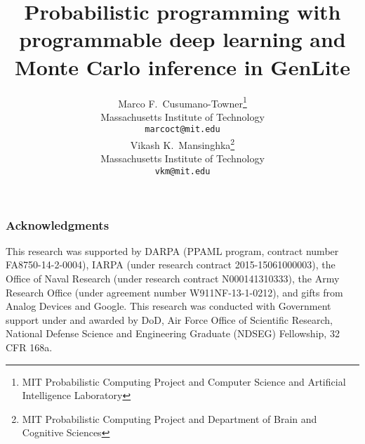 \documentclass{article}
\title{Probabilistic programming with programmable deep learning and Monte Carlo inference in GenLite}
\author{
  Marco F.~Cusumano-Towner\thanks{MIT Probabilistic Computing Project and Computer Science and Artificial Intelligence Laboratory}\\
  Massachusetts Institute of Technology\\
  \texttt{marcoct@mit.edu} \\
  \And
  Vikash K.~Mansinghka\thanks{MIT Probabilistic Computing Project and Department of Brain and Cognitive Sciences}\\
  Massachusetts Institute of Technology\\
  \texttt{vkm@mit.edu}
}
\begin{document}
\maketitle










\subsubsection*{Acknowledgments}
This research was supported by DARPA (PPAML program, contract number FA8750-14-2-0004), IARPA (under research contract 2015-15061000003), the Office of Naval Research (under research contract N000141310333), the Army Research Office (under agreement number W911NF-13-1-0212), and gifts from Analog Devices and Google.
This research was conducted with Government support under and awarded by DoD, Air Force Office of Scientific Research, National Defense Science and Engineering Graduate (NDSEG) Fellowship, 32 CFR 168a.



\end{document}
